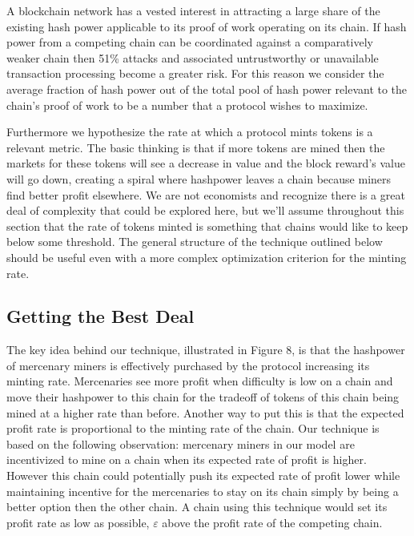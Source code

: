 \documentclass[10pt, preprint]{aastex}
\begin{document}
A blockchain network has a vested interest in attracting a large share of the existing hash power applicable to its proof of work operating on its chain.  If hash power from a competing chain can be coordinated against a comparatively weaker chain then 51\% attacks and associated untrustworthy or unavailable transaction processing become a greater risk.  For this reason we consider the average fraction of hash power out of the total pool of hash power relevant to the chain's proof of work to be a number that a protocol wishes to maximize.

Furthermore we hypothesize the rate at which a protocol mints tokens is a relevant metric.  The basic thinking is that if more tokens are mined then the markets for these tokens will see a decrease in value and the block reward's value will go down, creating a spiral where hashpower leaves a chain because miners find better profit elsewhere. We are not economists and recognize there is a great deal of complexity that could be explored here, but we'll assume throughout this section that the rate of tokens minted is something that chains would like to keep below some threshold.  The general structure of the technique outlined below should be useful even with a more complex optimization criterion for the minting rate.

\subsection{Getting the Best Deal}
The key idea behind our technique, illustrated in Figure 8, is that the hashpower of mercenary miners is effectively purchased by the protocol increasing its minting rate.  Mercenaries see more profit when difficulty is low on a chain and move their hashpower to this chain for the tradeoff of tokens of this chain being mined at a higher rate than before.  Another way to put this is that the expected profit rate is proportional to the minting rate of the chain.  Our technique is based on the following observation: mercenary miners in our model are incentivized to mine on a chain when its expected rate of profit is higher. However this chain could potentially push its expected rate of profit lower while maintaining incentive for the mercenaries to stay on its chain simply by being a better option then the other chain.  A chain using this technique would set its profit rate as low as possible, $\varepsilon$ above the profit rate of the competing chain. 
\end{document}
